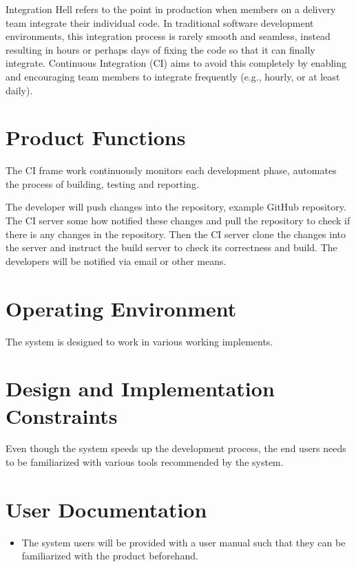 \documentclass[12pt,a4paper,oneside]{report}
\begin{document}
 \par Integration Hell refers to the point in production when members on a delivery team integrate their individual code. In traditional software development environments, this integration process is rarely smooth and seamless, instead resulting in hours or perhaps days of fixing the code so that it can finally integrate. Continuous Integration (CI) aims to avoid this completely by enabling and encouraging team members to integrate frequently (e.g., hourly, or at least daily).

\section{Product Functions}
\par
The CI frame work continuously monitors each development phase, automates the process of building, testing and reporting. 
\begin{figure}
\begin{center}
\end{center}
\end{figure} 
\par
The developer will push changes into the repository, example GitHub repository. The CI server some how notified these changes and pull the repository to check if there is any changes in the repository. Then the CI server clone the changes into the server and instruct the build server to check its correctness and build. The developers will be notified via email or other means.  


 \section{Operating Environment}
 The system is designed to work in various working implements.
 \section{Design and Implementation Constraints}
 Even though the system speeds up the development process, the end users needs to be familiarized with various tools recommended by the system.
\section{User Documentation}
 \begin{itemize}
 
 \item The system users will be provided with a user manual such that they can be familiarized with the product beforehand.
 \end{itemize}
\end{document}
